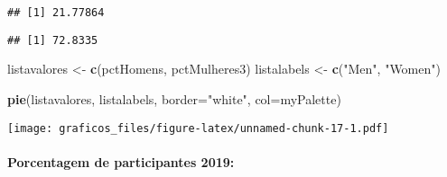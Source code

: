 \documentclass[
]{article}
\newenvironment{Shaded}{\begin{snugshade}}{\end{snugshade}}
\newcommand{\DataTypeTok}[1]{\textcolor[rgb]{0.13,0.29,0.53}{#1}}
\newcommand{\DecValTok}[1]{\textcolor[rgb]{0.00,0.00,0.81}{#1}}
\newcommand{\KeywordTok}[1]{\textcolor[rgb]{0.13,0.29,0.53}{\textbf{#1}}}
\newcommand{\NormalTok}[1]{#1}
\newcommand{\OperatorTok}[1]{\textcolor[rgb]{0.81,0.36,0.00}{\textbf{#1}}}
\newcommand{\StringTok}[1]{\textcolor[rgb]{0.31,0.60,0.02}{#1}}
\begin{document}
\begin{verbatim}
## [1] 21.77864
\end{verbatim}

\begin{Shaded}
\end{Shaded}

\begin{verbatim}
## [1] 72.8335
\end{verbatim}

\begin{Shaded}
\begin{Highlighting}[]
\NormalTok{listavalores <-}\StringTok{ }\KeywordTok{c}\NormalTok{(pctHomens, pctMulheres3)}
\NormalTok{listalabels <-}\StringTok{ }\KeywordTok{c}\NormalTok{(}\StringTok{"Men"}\NormalTok{, }\StringTok{"Women"}\NormalTok{)}


\KeywordTok{pie}\NormalTok{(listavalores, listalabels, }\DataTypeTok{border=}\StringTok{"white"}\NormalTok{, }\DataTypeTok{col=}\NormalTok{myPalette)}
\end{Highlighting}
\end{Shaded}

\texttt{[image: graficos\_files/figure-latex/unnamed-chunk-17-1.pdf]}

\hypertarget{porcentagem-de-participantes-2019}{%
\paragraph{Porcentagem de participantes
2019:}\label{porcentagem-de-participantes-2019}}

\begin{Shaded}
\end{Shaded}
\end{document}
